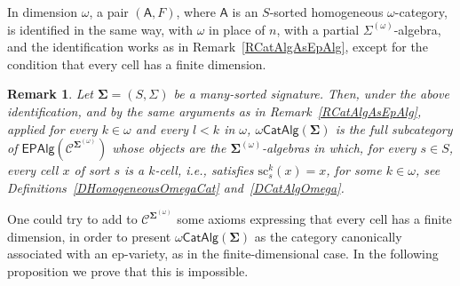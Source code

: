 \documentclass[a4paper, reqno]{amsbook}
\newcommand{\sig}[1]{\mathbf{#1}}             %
\newcommand{\spec}[1]{\boldsymbol{\mathcal{#1}}} %
\newcommand{\src}{\mathrm{sc}}
\theoremstyle{plain}
\newtheorem{remark}[theorem]{Remark}
\theoremstyle{definition}
\begin{document}
In dimension $\omega$, a pair $(\mathsf{A},F)$, where $\mathsf{A}$ is an $S$-sorted homogeneous $\omega$-category, is identified in the same way, with $\omega$ in place of $n$, with a partial $\Sigma^{(\omega)}$-algebra, and the identification works as in Remark~\ref{RCatAlgAsEpAlg}, except for the condition that every cell has a finite dimension.

\begin{remark}\label{RCatAlgAsEpAlgOmega}
Let $\sig{\Sigma}=(S,\Sigma)$ be a many-sorted signature.
Then, under the above identification, and by the same arguments as in Remark~\ref{RCatAlgAsEpAlg}, applied for every $k\in\omega$ and every $l<k$ in $\omega$, $\omega\mathsf{CatAlg}(\sig{\Sigma})$ is the full subcategory of $\mathsf{EPAlg}(\spec{C}^{\sig{\Sigma}^{(\omega)}})$ whose objects are the $\sig{\Sigma}^{(\omega)}$-algebras in which, for every $s\in S$, every cell $x$ of sort $s$ is a $k$-cell, i.e., satisfies $\src^{k}_{s}(x)=x$, for some $k\in\omega$, see Definitions~\ref{DHomogeneousOmegaCat} and~\ref{DCatAlgOmega}.
\end{remark}

One could try to add to $\mathcal{C}^{\sig{\Sigma}^{(\omega)}}$ some axioms expressing that every cell has a finite dimension, in order to present $\omega\mathsf{CatAlg}(\sig{\Sigma})$ as the category canonically associated with an ep-variety, as in the finite-dimensional case.
In the following proposition we prove that this is impossible.
\end{document}

